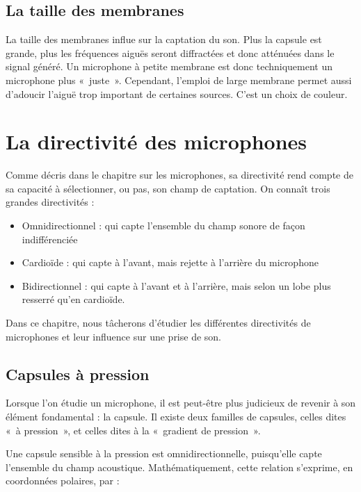 \documentclass[
]{book}
\providecommand{\tightlist}{%
  \setlength{\itemsep}{0pt}\setlength{\parskip}{0pt}}
\begin{document}
\hypertarget{la-taille-des-membranes}{%
\section{La taille des membranes}\label{la-taille-des-membranes}}

La taille des membranes influe sur la captation du son. Plus la capsule est grande, plus les fréquences aiguës seront diffractées et donc atténuées dans le signal généré.
Un microphone à petite membrane est donc techniquement un microphone plus «~juste~». Cependant, l'emploi de large membrane permet aussi d'adoucir l'aiguë trop important de certaines sources. C'est un choix de couleur.

\hypertarget{la-directivituxe9-des-microphones}{%
\chapter{La directivité des microphones}\label{la-directivituxe9-des-microphones}}

Comme décris dans le chapitre sur les microphones, sa directivité rend compte de sa capacité à sélectionner, ou pas, son champ de captation. On connaît trois grandes directivités :

\begin{itemize}
\tightlist
\item
  Omnidirectionnel : qui capte l'ensemble du champ sonore de façon indifférenciée
\item
  Cardioïde : qui capte à l'avant, mais rejette à l'arrière du microphone
\item
  Bidirectionnel : qui capte à l'avant et à l'arrière, mais selon un lobe plus resserré qu'en cardioïde.
\end{itemize}

Dans ce chapitre, nous tâcherons d'étudier les différentes directivités de microphones et leur influence sur une prise de son.

\hypertarget{capsules-uxe0-pression}{%
\section{Capsules à pression}\label{capsules-uxe0-pression}}

Lorsque l'on étudie un microphone, il est peut-être plus judicieux de revenir à son élément fondamental : la capsule. Il existe deux familles de capsules, celles dites «~à pression~», et celles dites à la «~gradient de pression~».

Une capsule sensible à la pression est omnidirectionnelle, puisqu'elle capte l'ensemble du champ acoustique. Mathématiquement, cette relation s'exprime, en coordonnées polaires, par :
\end{document}
